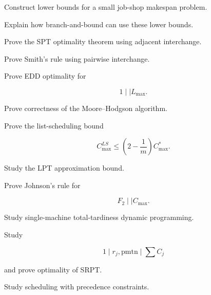 \begin{exercise}[3]
Construct lower bounds for a small job-shop makespan problem.
\end{exercise}

\begin{exercise}[3]
Explain how branch-and-bound can use these lower bounds.
\end{exercise}

\begin{exercise}[4]
Prove the SPT optimality theorem using adjacent interchange.
\end{exercise}

\begin{exercise}[4]
Prove Smith's rule using pairwise interchange.
\end{exercise}

\begin{exercise}[4]
Prove EDD optimality for

\[
1\mid\mid L_{\max}.
\]
\end{exercise}

\begin{exercise}[4]
Prove correctness of the Moore--Hodgson algorithm.
\end{exercise}

\begin{exercise}[4]
Prove the list-scheduling bound

\[
C_{\max}^{LS}
\leq
\left(
2-\frac1m
\right)
C_{\max}^*.
\]
\end{exercise}

\begin{exercise}[4]
Study the LPT approximation bound.
\end{exercise}

\begin{exercise}[4]
Prove Johnson's rule for

\[
F_2\mid\mid C_{\max}.
\]
\end{exercise}

\begin{exercise}[4]
Study single-machine total-tardiness dynamic programming.
\end{exercise}

\begin{exercise}[4]
Study

\[
1\mid r_j,\mathrm{pmtn}\mid\sum C_j
\]

and prove optimality of SRPT.
\end{exercise}

\begin{exercise}[4]
Study scheduling with precedence constraints.
\end{exercise}


